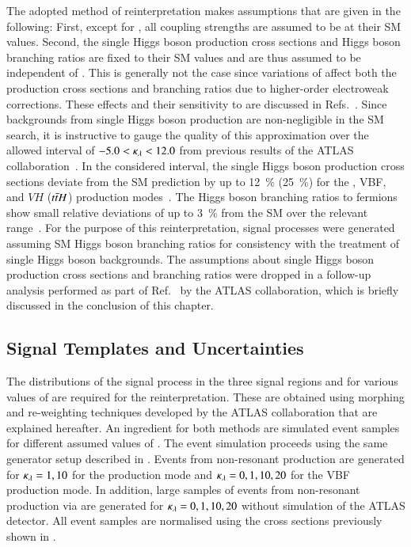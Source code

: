 The adopted method of reinterpretation makes assumptions that are given in the
following: First, except for \klambda, all coupling strengths are assumed to be
at their SM values. Second, the single Higgs boson production cross sections and
Higgs boson branching ratios are fixed to their SM values and are thus assumed
to be independent of \klambda. This is generally not the case since variations
of \klambda affect both the production cross sections and branching ratios due
to higher-order electroweak corrections. These effects and their sensitivity to
\klambda are discussed in
Refs.~\cite{ATL-PHYS-PUB-2019-009,Degrassi:2016wml,Maltoni:2017ims}.  Since
backgrounds from single Higgs boson production are non-negligible in the SM \HH
search, it is instructive to gauge the quality of this approximation over the
allowed interval of $-5.0 < \kappa_{\lambda} < 12.0$ from previous results of the ATLAS
collaboration~\cite{HDBS-2018-58}. In the considered \klambda interval, the
single Higgs boson production cross sections deviate from the SM prediction by
up to \SI{12}{\percent} (\SI{25}{\percent}) for the \ggF, VBF, and $VH$
($t\bar{t} H$) production modes~\cite{ATL-PHYS-PUB-2019-009}. The Higgs boson
branching ratios to fermions show small relative deviations of up to
\SI{3}{\percent} from the SM over the relevant \klambda
range~\cite{ATL-PHYS-PUB-2019-009}. For the purpose of this reinterpretation,
signal processes were generated assuming SM Higgs boson branching ratios for
consistency with the treatment of single Higgs boson backgrounds. The
assumptions about single Higgs boson production cross sections and branching
ratios were dropped in a follow-up analysis performed as part of
Ref.~\cite{HDBS-2022-03} by the ATLAS collaboration, which is briefly discussed
in the conclusion of this chapter.


\subsection{Signal Templates and Uncertainties}%
\label{sec:self_coupling_signals}

The distributions of the signal process in the three signal regions
and for various values of \klambda are required for the
reinterpretation.
These are obtained using morphing and re-weighting techniques
developed by the ATLAS collaboration that are explained hereafter. An
ingredient for both methods are simulated event samples for different
assumed values of \klambda. The event simulation proceeds using the
same generator setup described in
. Events from non-resonant \HH
production are generated for $\kappa_{\lambda} = 1, 10$ for the \ggF
production mode and $\kappa_{\lambda} = 0, 1, 10, 20$ for the VBF production
mode. In addition, large samples of events from non-resonant \HH
production via \ggF are generated for $\kappa_{\lambda} = 0, 1, 10, 20$
without simulation of the ATLAS detector. All event samples are
normalised using the cross sections previously shown in
.

